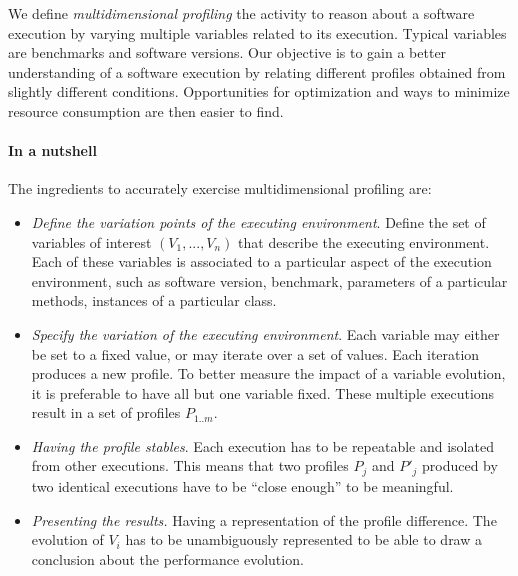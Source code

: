 \documentclass[10pt, conference, compsocconf]{IEEEtran}
\newcommand{\ie}{\emph{i.e.,}\xspace}
\begin{document}
We define \emph{multidimensional profiling} the activity to reason about a software execution by varying multiple variables related to its execution. Typical variables are benchmarks and software versions. Our objective is to gain a better understanding of a software execution by relating different profiles obtained from slightly different conditions. Opportunities for optimization and ways to minimize resource consumption are then easier to find.


\paragraph{In a nutshell}

The ingredients to accurately exercise multidimensional profiling are:

\begin{itemize}
\item \emph{Define the variation points of the executing environment}. Define the set of variables of interest $(V_1, ..., V_n)$ that describe the executing environment. Each of these variables is associated to a particular aspect of the execution environment, such as software version, benchmark, parameters of a particular methods, instances of a particular class. 

\item \emph{Specify the variation of the executing environment}. Each variable may either be set to a fixed value, or may iterate over a set of values. Each iteration produces a new profile. To better measure the impact of a variable evolution, it is preferable to have all but one variable fixed. These multiple executions result in a set of profiles $P_{1..m}$. 


\item \emph{Having the profile stables}. Each execution has to be repeatable and isolated from other executions. This means that two profiles $P_j$ and $P'_j$ produced by two identical executions have to be ``close enough'' to be meaningful.

\item \emph{Presenting the results.} Having a representation of the profile difference. The evolution of $V_i$ has to be unambiguously represented to be able to draw a conclusion about the performance evolution.
\end{itemize}
\end{document}
